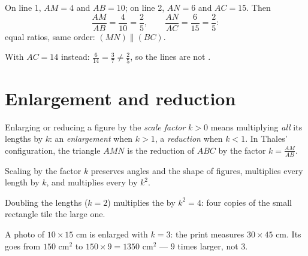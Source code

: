 \begin{example}\label{ex:g9:thales:converse}
On line 1, $AM = 4$ and $AB = 10$; on line 2, $AN = 6$ and $AC = 15$.
Then
\[
\frac{AM}{AB} = \frac{4}{10} = \frac25,
\qquad
\frac{AN}{AC} = \frac{6}{15} = \frac25 :
\]
equal ratios, same order: $(MN) \parallel (BC)$.

With $AC = 14$ instead: $\frac{6}{14} = \frac37 \neq \frac25$, so the
lines are not .
\end{example}

\section{Enlargement and reduction}

\begin{definition}\label{def:g9:thales:scaling}
Enlarging or reducing a figure by the \emph{scale
factor} $k > 0$ means multiplying \emph{all} its
lengths by $k$: an \emph{enlargement} when $k > 1$, a \emph{reduction}
when $k < 1$. In Thales' configuration, the triangle $AMN$ is the
reduction of $ABC$ by the factor $k = \frac{AM}{AB}$.
\end{definition}

\begin{proposition}\label{prop:g9:thales:scaling}
Scaling by the factor $k$ preserves angles and the shape of figures,
multiplies every length by $k$, and multiplies every \emph{} by
$k^2$.
\end{proposition}
\admitted

\begin{omfigure}

{\small Doubling the lengths ($k = 2$) multiplies the  by
$k^2 = 4$: four copies of the small rectangle tile the large one.}
\end{omfigure}

\begin{example}
A photo of $10 \times 15$ cm is enlarged with  $k = 3$: the
print measures $30 \times 45$ cm. Its  goes from $150$ cm$^2$ to
$150 \times 9 = 1350$ cm$^2$ --- $9$ times larger, not $3$.
\end{example}

